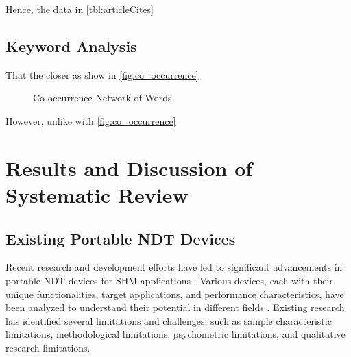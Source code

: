 \documentclass[journal, a4paper]{IEEEtran}
\begin{document}
Hence, the data in \autoref{tbl:articleCites} \lipsum[1]



\subsection{Keyword Analysis}
That the closer as show in \autoref{fig:co_occurrence} \lipsum[1]

\begin{figure}[htbp]
  \centering
  \caption{Co-occurrence Network of Words}
  \label{fig:co_occurrence}
\end{figure}

However, unlike with \autoref{fig:co_occurrence} \lipsum[1]






\section{Results and Discussion of Systematic Review}

\subsection{Existing Portable NDT Devices}
Recent research and development efforts have led to significant advancements in portable NDT devices
for SHM applications \cite{Vijayan2023} \cite{Parsy2018} \cite{Hassani2023}.
Various devices, each with their unique functionalities, target applications, and performance characteristics,
have been analyzed to understand their potential in different fields \cite{Khanna2020} \cite{Baig2021} \cite{Corzo2020}.
Existing research has identified several limitations and challenges, such as sample characteristic limitations,
methodological limitations, psychometric limitations, and qualitative research limitations.
\end{document}
